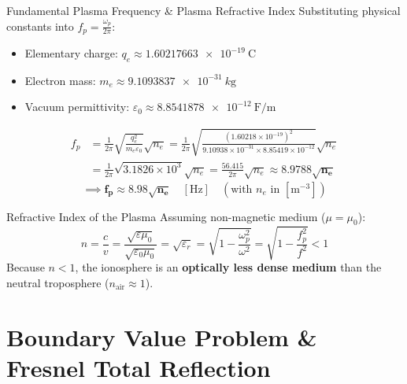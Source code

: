 \documentclass[aspectratio=169, 10pt]{beamer}
\newcommand{\kilo}{k}
\begin{document}
\begin{frame}{Fundamental Plasma Frequency \& Plasma Refractive Index}
\small
    Substituting physical constants into $f_p = \frac{\omega_p}{2\pi}$:
    \begin{itemize}
        \item Elementary charge: $q_e \approx \SI{1.60217663e-19}{\coulomb}$
        \item Electron mass: $m_e \approx \SI{9.1093837e-31}{\kilo\gram}$
        \item Vacuum permittivity: $\varepsilon_0 \approx \SI{8.8541878e-12}{\farad\per\m}$
    \end{itemize}
    \begin{align}
        f_p &= \frac{1}{2\pi} \sqrt{\frac{q_e^2}{m_e \varepsilon_0}} \sqrt{n_e} = \frac{1}{2\pi} \sqrt{\frac{(1.60218\times 10^{-19})^2}{9.10938\times 10^{-31} \times 8.85419\times 10^{-12}}} \sqrt{n_e} \nonumber \\
        &= \frac{1}{2\pi} \sqrt{3.1826 \times 10^3} \sqrt{n_e} = \frac{56.415}{2\pi} \sqrt{n_e} \approx \mathbf{8.9788 \sqrt{n_e}}
    \end{align}
    \begin{equation}
        \implies \mathbf{f_p \approx 8.98 \sqrt{n_e}}\quad [\si{\hertz}] \quad (\text{with } n_e \text{ in } [\si{\m^{-3}}])
    \end{equation}

    \begin{alertblock}{Refractive Index of the Plasma}
        Assuming non-magnetic medium ($\mu = \mu_0$):
        \begin{equation}
            n = \frac{c}{v} = \frac{\sqrt{\varepsilon \mu_0}}{\sqrt{\varepsilon_0\mu_0}} = \sqrt{\varepsilon_r} = \sqrt{1 - \frac{\omega_p^2}{\omega^2}} = \sqrt{1 - \frac{f_p^2}{f^2}} < 1
        \end{equation}
        Because $n < 1$, the ionosphere is an \textbf{optically less dense medium} than the neutral troposphere ($n_{\text{air}} \approx 1$).
    \end{alertblock}
\end{frame}

\section{Boundary Value Problem \& Fresnel Total Reflection}
\end{document}
